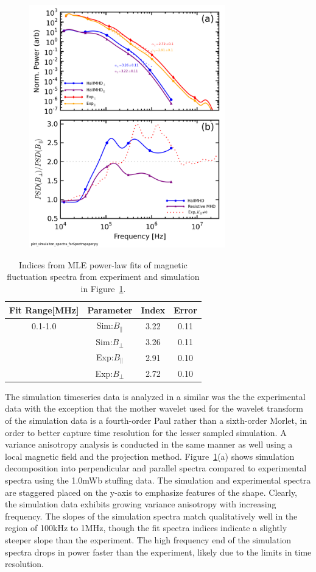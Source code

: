 \documentclass[aip,prl,amsmath,amssymb,reprint,superscriptaddress]{revtex4-1} %
\begin{document}
\begin{figure}[!htbp]
\centerline{
\includegraphics[width=8.5cm]{Anisotropy_simulation_comparison}}
\caption{\label{fig:aniso_comp}}
\end{figure}

\begin{table}
\caption{\label{tab:Bindices}Indices from MLE power-law fits of magnetic fluctuation spectra from experiment and simulation in Figure~\ref{fig:aniso_comp}.}
\begin{tabular}{cccc}
\toprule
Fit Range[MHz]	&	Parameter						&	Index	&Error\\
\hline
0.1-1.0					& Sim:$B_{\parallel}$	& 3.22	&0.11\\
								& Sim:$B_{\perp}$			& 3.26  &0.11\\
								& Exp:$B_{\parallel}$	& 2.91	&0.10\\
								& Exp:$B_{\perp}$			& 2.72  &0.10\\
\hline
\end{tabular}
\end{table}

The simulation timeseries data is analyzed in a similar was the the experimental data with the exception that the mother wavelet used for the wavelet transform of the simulation data is a fourth-order Paul rather than a sixth-order Morlet, in order to better capture time resolution for the lesser sampled simulation. A variance anisotropy analysis is conducted in the same manner as well using a local magnetic field and the projection method. Figure~\ref{fig:aniso_comp}(a) shows simulation decomposition into perpendicular and parallel spectra compared to experimental spectra using the 1.0mWb stuffing data. The simulation and experimental spectra are staggered placed on the y-axis to emphasize features of the shape. Clearly, the simulation data exhibits growing variance anisotropy with increasing frequency. The slopes of the simulation spectra match qualitatively well in the region of 100kHz to 1MHz, though the fit spectra indices indicate a slightly steeper slope than the experiment. The high frequency end of the simulation spectra drops in power faster than the experiment, likely due to the limits in time resolution.
\end{document}
